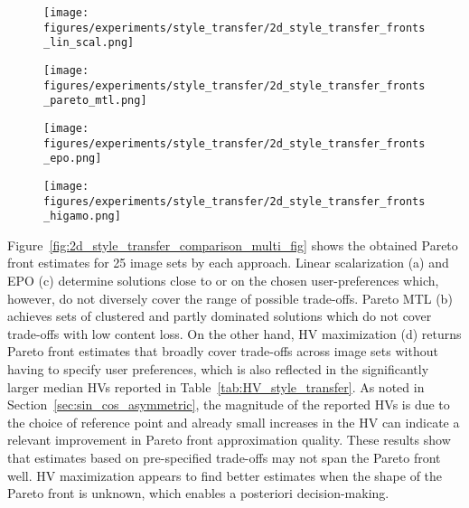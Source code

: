 \begin{figure*}[h!]
\begin{subfigure}{0.45\textwidth}
    \centering
    \texttt{[image: figures/experiments/style\_transfer/2d\_style\_transfer\_fronts\_lin\_scal.png]}
    \caption{}
    \label{fig:2d_style_transfer_comparison_multi_fig_lin_scal}
\end{subfigure}
\begin{subfigure}{0.45\textwidth}
    \centering
    \texttt{[image: figures/experiments/style\_transfer/2d\_style\_transfer\_fronts\_pareto\_mtl.png]}
    \caption{}
    \label{fig:2d_style_transfer_comparison_multi_fig_pareto_mtl}
\end{subfigure}
\begin{subfigure}{0.45\textwidth}
    \centering
    \texttt{[image: figures/experiments/style\_transfer/2d\_style\_transfer\_fronts\_epo.png]}
    \caption{}
    \label{fig:2d_style_transfer_comparison_multi_fig_epo}
\end{subfigure}
\begin{subfigure}{0.45\textwidth}
    \centering
    \texttt{[image: figures/experiments/style\_transfer/2d\_style\_transfer\_fronts\_higamo.png]}
    \caption{}
    \label{fig:2d_style_transfer_comparison_multi_fig_higamo_hv}
\end{subfigure}
    \centering
    \caption{Pareto front estimates in loss space by different approaches for neural style transfer using four approaches: (a) Linear scalarization (b) Pareto MTL, (c) EPO, and (d) HV maximization. Sections within the black frames are magnified.}
    \label{fig:2d_style_transfer_comparison_multi_fig}
\end{figure*}
Figure~\ref{fig:2d_style_transfer_comparison_multi_fig} shows the obtained Pareto front estimates for 25 image sets by each approach. Linear scalarization (a) and EPO (c) determine solutions close to or on the chosen user-preferences which, however, do not diversely cover the range of possible trade-offs. Pareto MTL (b) achieves sets of clustered and partly dominated solutions which do not cover trade-offs with low content loss. On the other hand, HV maximization (d) returns Pareto front estimates that broadly cover trade-offs across image sets without having to specify user preferences, which is also reflected in the significantly larger median HVs reported in Table~\ref{tab:HV_style_transfer}. As noted in Section~\ref{sec:sin_cos_asymmetric}, the magnitude of the reported HVs is due to the choice of reference point and already small increases in the HV can indicate a relevant improvement in Pareto front approximation quality.
These results show that estimates based on pre-specified trade-offs may not span the Pareto front well. HV maximization appears to find better estimates when the shape of the Pareto front is unknown, which enables a posteriori decision-making.  

